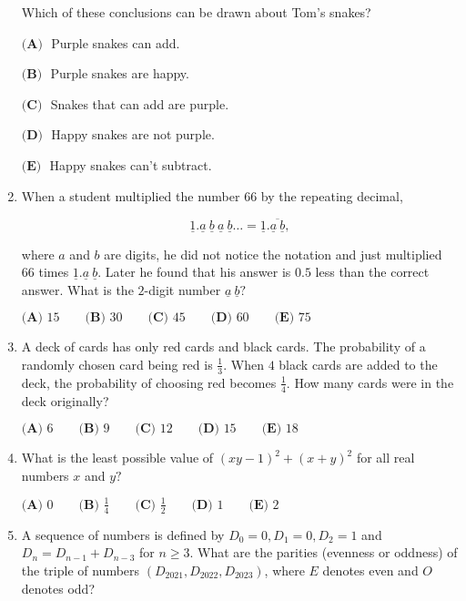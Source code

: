 \documentclass{article}
\begin{document}
\begin{enumerate}[label=\arabic*., itemsep=0.5em]
Which of these conclusions can be drawn about Tom's snakes?

\(\textbf{(A) }\) Purple snakes can add.

\(\textbf{(B) }\) Purple snakes are happy.

\(\textbf{(C) }\) Snakes that can add are purple.

\(\textbf{(D) }\) Happy snakes are not purple.

\(\textbf{(E) }\) Happy snakes can't subtract.\par \vspace{0.5em}\item When a student multiplied the number \(66\) by the repeating decimal, 

\begin{equation*}
\underline{1}.\underline{a} \ \underline{b} \ \underline{a} \ \underline{b}\ldots=\underline{1}.\overline{\underline{a} \ \underline{b}},
\end{equation*}
 
where \(a\) and \(b\) are digits, he did not notice the notation and just multiplied \(66\) times \(\underline{1}.\underline{a} \ \underline{b}.\) Later he found that his answer is \(0.5\) less than the correct answer. What is the \(2\)-digit number \(\underline{a} \ \underline{b}?\)

\(\textbf{(A) }15 \qquad \textbf{(B) }30 \qquad \textbf{(C) }45 \qquad \textbf{(D) }60 \qquad \textbf{(E) }75\)\par \vspace{0.5em}\item A deck of cards has only red cards and black cards. The probability of a randomly chosen card being red is \(\frac13\). When \(4\) black cards are added to the deck, the probability of choosing red becomes \(\frac14\). How many cards were in the deck originally?

\(\textbf{(A) }6 \qquad \textbf{(B) }9 \qquad \textbf{(C) }12 \qquad \textbf{(D) }15 \qquad \textbf{(E) }18\)\par \vspace{0.5em}\item What is the least possible value of \((xy-1)^2+(x+y)^2\) for all real numbers \(x\) and \(y?\)

\(\textbf{(A) }0 \qquad \textbf{(B) }\frac14 \qquad \textbf{(C) }\frac12 \qquad \textbf{(D) }1 \qquad \textbf{(E) }2\)\par \vspace{0.5em}\item A sequence of numbers is defined by \(D_0=0,D_1=0,D_2=1\) and \(D_n=D_{n-1}+D_{n-3}\) for \(n\ge 3\). What are the parities (evenness or oddness) of the triple of numbers \((D_{2021},D_{2022},D_{2023})\), where \(E\) denotes even and \(O\) denotes odd?


\end{enumerate}
\end{document}
